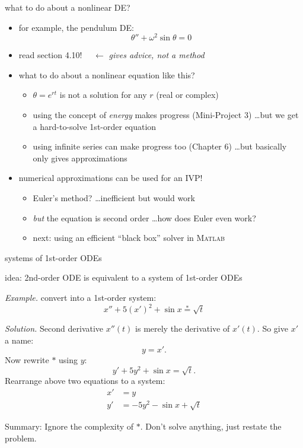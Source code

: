 \documentclass[dvipsnames,colorlinks]{beamer}
\newcommand{\Matlab}{\textsc{Matlab}}
\begin{document}
\begin{frame}{what to do about a nonlinear DE?}

\begin{itemize}
\item for example, the pendulum DE:
    $$\theta'' + \omega^2 \sin\theta = 0$$
\item \alert{read section 4.10!}  $\quad \longleftarrow$ \emph{gives advice, not a method}
\item what to do about a nonlinear equation like this?
    \begin{itemize}
    \item $\theta=e^{rt}$ is not a solution for any $r$ (real or complex)
    \item using the concept of \emph{energy} makes progress (Mini-Project 3) \dots but we get a hard-to-solve 1st-order equation
    \item using infinite series can make progress too (Chapter 6) \dots but basically only gives approximations
    \end{itemize}
\item numerical approximations can be used for an IVP!
    \begin{itemize}
    \item Euler's method? \dots inefficient but would work
    \item \emph{but} the equation is second order \dots how does Euler even work?
    \item next: using an efficient ``black box'' solver in \footnotesize \Matlab
    \end{itemize}
\end{itemize}
\end{frame}


\begin{frame}{systems of 1st-order ODEs}

\medskip

   \centerline{idea: \alert{2nd-order ODE is equivalent to a system of 1st-order ODEs}}

\bigskip
\noindent \emph{Example.} convert into a 1st-order system:
    $$x''+5(x')^2+\sin x \stackrel{\ast}{=} \sqrt{t}$$

\noindent \emph{Solution.}  Second derivative $x''(t)$ is merely the derivative of $x'(t)$.  So give $x'$ a name:
    $$y = x'.$$
Now rewrite $\ast$ using $y$:
    $$y' + 5 y^2 + \sin x = \sqrt{t}.$$
Rearrange above two equations to a system:
\begin{align*}
x' &= y \\
y' &= - 5 y^2 - \sin x + \sqrt{t}
\end{align*}

\medskip
\scriptsize
\alert{Summary: Ignore the complexity of $\ast$.  Don't solve anything, just restate the problem.}
\end{frame}
\end{document}

